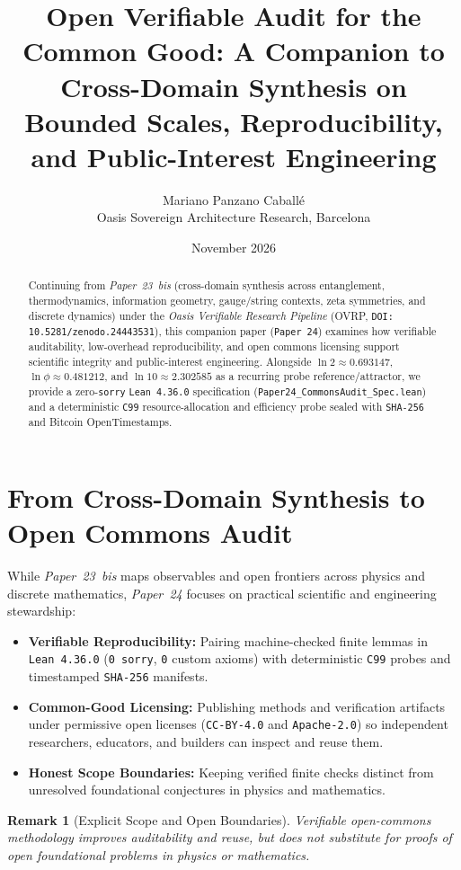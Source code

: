 \documentclass[11pt,a4paper]{article}
\title{Open Verifiable Audit for the Common Good: A Companion to Cross-Domain Synthesis on Bounded Scales, Reproducibility, and Public-Interest Engineering}
\author{Mariano Panzano Caball\'e \\ \small Oasis Sovereign Architecture Research, Barcelona}
\date{November 2026}
\newtheorem{remark}{Remark}
\begin{document}
\maketitle

\begin{abstract}
Continuing from \emph{Paper~23~bis} (cross-domain synthesis across entanglement, thermodynamics, information geometry, gauge/string contexts, zeta symmetries, and discrete dynamics) under the \emph{Oasis Verifiable Research Pipeline} (OVRP, \texttt{DOI: 10.5281/zenodo.24443531}), this companion paper (\texttt{Paper~24}) examines how verifiable auditability, low-overhead reproducibility, and open commons licensing support scientific integrity and public-interest engineering. Alongside $\ln 2 \approx 0.693147$, $\ln \phi \approx 0.481212$, and $\ln 10 \approx 2.302585$ as a recurring probe reference/attractor, we provide a zero-\texttt{sorry} \texttt{Lean~4.36.0} specification (\texttt{Paper24\_CommonsAudit\_Spec.lean}) and a deterministic \texttt{C99} resource-allocation and efficiency probe sealed with \texttt{SHA-256} and Bitcoin OpenTimestamps.
\end{abstract}

\section{From Cross-Domain Synthesis to Open Commons Audit}
While \emph{Paper~23~bis} maps observables and open frontiers across physics and discrete mathematics, \emph{Paper~24} focuses on practical scientific and engineering stewardship:
\begin{itemize}
  \item \textbf{Verifiable Reproducibility:} Pairing machine-checked finite lemmas in \texttt{Lean~4.36.0} (\texttt{0 sorry}, \texttt{0} custom axioms) with deterministic \texttt{C99} probes and timestamped \texttt{SHA-256} manifests.
  \item \textbf{Common-Good Licensing:} Publishing methods and verification artifacts under permissive open licenses (\texttt{CC-BY-4.0} and \texttt{Apache-2.0}) so independent researchers, educators, and builders can inspect and reuse them.
  \item \textbf{Honest Scope Boundaries:} Keeping verified finite checks distinct from unresolved foundational conjectures in physics and mathematics.
\end{itemize}

\begin{remark}[Explicit Scope and Open Boundaries]
Verifiable open-commons methodology improves auditability and reuse, but does not substitute for proofs of open foundational problems in physics or mathematics.
\end{remark}
\end{document}

